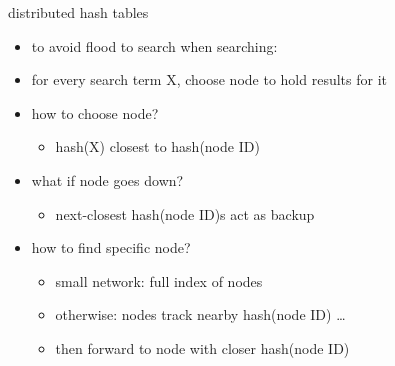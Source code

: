 \begin{frame}{distributed hash tables}
    \begin{itemize}
    \item to avoid flood to search when searching:
    \item for every search term X, choose node to hold results for it
    \item how to choose node?
        \begin{itemize}
        \item hash(X) closest to hash(node ID)
        \end{itemize}
    \item what if node goes down?
        \begin{itemize}
        \item next-closest hash(node ID)s act as backup
        \end{itemize}
    \item how to find specific node?
        \begin{itemize}
        \item small network: full index of nodes
        \item otherwise: nodes track nearby hash(node ID) \ldots
        \item then forward to node with closer hash(node ID)
        \end{itemize}
    \end{itemize}
\end{frame}
